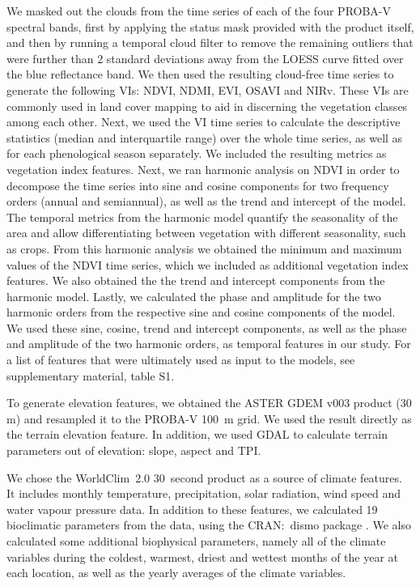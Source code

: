 \documentclass[review,authoryear,3p]{elsarticle}
\newcommand{\cran}[1]{CRAN:~#1}
\begin{document}
We masked out the clouds from the time series of each of the four PROBA-V spectral bands, first by applying the status mask provided with the product itself, and then by running a temporal cloud filter to remove the remaining outliers that were further than 2 standard deviations away from the \ac{LOESS} curve fitted over the blue reflectance band.
We then used the resulting cloud-free time series to generate the following \glspl{VI}: \gls{NDVI}, \gls{NDMI}, \gls{EVI}, \gls{OSAVI} and \gls{NIRv}.
These \glspl{VI} are commonly used in land cover mapping to aid in discerning the vegetation classes among each other.
Next, we used the \gls{VI} time series to calculate the descriptive statistics (median and interquartile range) over the whole time series, as well as for each phenological season separately.
We included the resulting metrics as vegetation index features.
Next, we ran harmonic analysis \citep{jakubauskas2001harmonic} on NDVI in order to decompose the time series into sine and cosine components for two frequency orders (annual and semiannual), as well as the trend and intercept of the model.
The temporal metrics from the harmonic model quantify the seasonality of the area and allow differentiating between vegetation with different seasonality, such as crops.
From this harmonic analysis we obtained the minimum and maximum values of the \gls{NDVI} time series, which we included as additional vegetation index features.
We also obtained the the trend and intercept components from the harmonic model.
Lastly, we calculated the phase and amplitude for the two harmonic orders from the respective sine and cosine components of the model.
We used these sine, cosine, trend and intercept components, as well as the phase and amplitude of the two harmonic orders, as temporal features in our study.
For a list of features that were ultimately used as input to the models, see supplementary material, table S1.

To generate elevation features, we obtained the ASTER GDEM v003 \citep{ASTGTM003} product (30 m) and resampled it to the PROBA-V 100~m grid.
We used the result directly as the terrain elevation feature.
In addition, we used \gls{GDAL} \citep{gdal} to calculate terrain parameters out of elevation: slope, aspect and \ac{TPI}.

We chose the WorldClim~2.0 30~second product \citep{worldclim2} as a source of climate features.
It includes monthly temperature, precipitation, solar radiation, wind speed and water vapour pressure data.
In addition to these features, we calculated 19 bioclimatic parameters from the data, using the \cran{dismo} package \citep{dismo}.
We also calculated some additional biophysical parameters, namely all of the climate variables during the coldest, warmest, driest and wettest months of the year at each location, as well as the yearly averages of the climate variables.
\end{document}
